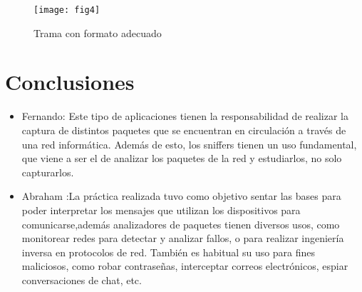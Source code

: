 \documentclass[a4paper,12pt]{article}
\begin{document}
\begin{figure}[h]
\center
\texttt{[image: fig4]}
\caption{Trama con formato adecuado}
\end{figure}

\section{Conclusiones}
\begin{itemize}
\item Fernando: Este tipo de aplicaciones tienen la responsabilidad de realizar la captura de distintos paquetes que se encuentran en circulación a través de una red informática.  Además de esto, los sniffers tienen un uso fundamental, que viene a ser el de analizar los paquetes de la red y estudiarlos, no solo capturarlos.

\item Abraham :La práctica realizada tuvo como objetivo sentar las bases para poder interpretar los mensajes que utilizan los dispositivos para comunicarse,además  analizadores de paquetes tienen diversos usos, como monitorear redes para detectar y analizar fallos, o para realizar ingeniería inversa en protocolos de red. También es habitual su uso para fines maliciosos, como robar contraseñas, interceptar correos electrónicos, espiar conversaciones de chat, etc.
\end{itemize}
\end{document}
